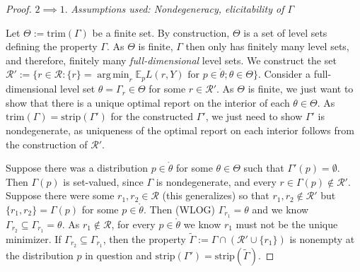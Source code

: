 \documentclass[12pt]{article}
\newcommand{\E}{\mathbb{E}}
\newcommand{\R}{\mathcal{R}}
\newcommand{\inter}[1]{\mathring{#1}}%
\newcommand{\trim}{\mathrm{trim}}
\newcommand{\im}{\text{im}}
\newcommand{\strip}{\text{strip}}
\DeclareMathOperator*{\argmin}{arg\,min}
\begin{document}
\begin{proof}





\bigskip
$2 \implies 1$.  
\emph{Assumptions used: Nondegeneracy, elicitability of $\Gamma$}

Let $\Theta := \trim(\Gamma)$ be a finite set.
By construction, $\Theta$ is a set of level sets defining the property $\Gamma$.
As $\Theta$ is finite, $\Gamma$ then only has finitely many level sets, and therefore, finitely many \emph{full-dimensional} level sets.
We construct the set $\R' := \{r \in \R : \{r\} = \argmin_r \E_p L(r,Y) \text{ for } p \in \inter{\theta}; \theta \in \Theta \}$.
Consider a full-dimensional level set $\theta = \Gamma_r \in \Theta$ for some $r \in \R'$.
As $\Theta$ is finite, we just want to show that there is a unique optimal report on the interior of each $\theta \in \Theta$.
As $\trim(\Gamma) = \strip(\Gamma')$ for the constructed $\Gamma'$, we just need to show $\Gamma'$ is nondegenerate, as uniqueness of the optimal report on each interior follows from the construction of $\R'$.

Suppose there was a distribution $p \in \inter{\theta}$ for some $\theta \in \Theta$ such that $\Gamma'(p) = \emptyset$.
Then $\Gamma(p)$ is set-valued, since $\Gamma$ is nondegenerate, and every $r \in \Gamma(p) \not\in \R'$.
Suppose there were some $r_1, r_2 \in \R$ (this generalizes) so that $r_1, r_2 \not \in \R'$ but $\{r_1, r_2\} = \Gamma(p)$ for some $p \in \inter{\theta}$.
Then (WLOG) $\Gamma_{r_1} = \theta$ and we know $\Gamma_{r_2} \subseteq \Gamma_{r_1} = \theta$.
As $r_1 \not\in \R$, for every $p \in \inter{\theta}$ we know $r_1$ must not be the unique minimizer.
If $\Gamma_{r_2} \subseteq \Gamma_{r_1}$, then the property $\tilde \Gamma := \Gamma \cap (\R' \cup \{r_1\})$ is nonempty at the distribution $p$ in question and $\strip(\Gamma') = \strip(\tilde \Gamma)$.



\end{proof}
\end{document}
